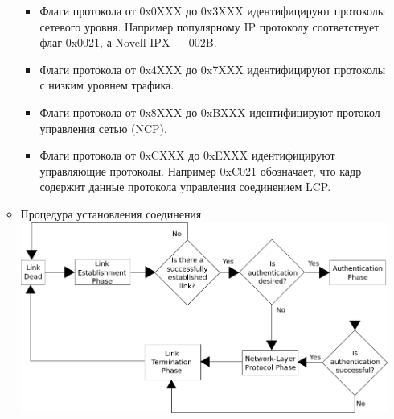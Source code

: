 \documentclass[12pt, russian, oneside, article]{ncc}
\begin{document}
\begin{itemize}
\begin{itemize}
\begin{itemize}
\item Флаги протокола от 0x0XXX до 0x3XXX идентифицируют протоколы сетевого уровня. Например популярному IP протоколу соответствует флаг 0x0021, а Novell IPX — 002B.
\item Флаги протокола от 0x4XXX до 0x7XXX идентифицируют протоколы с низким уровнем трафика.
\item Флаги протокола от 0x8XXX до 0xBXXX идентифицируют протокол управления сетью (NCP).
\item Флаги протокола от 0xCXXX до 0xEXXX идентифицируют управляющие протоколы. Например 0xC021 обозначает, что кадр содержит данные протокола управления соединением LCP.
\end{itemize}


\item Процедура установления соединения\\
\label{sec-5_2_11_3_2}%
\includegraphics[]{images/SiSPI/pppphase.png}



\end{itemize}
\end{itemize}
\end{document}
